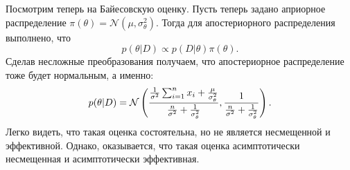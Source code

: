 \begin{example}
Посмотрим теперь на Байесовскую оценку.
Пусть теперь задано априорное распределение $\pi(\theta) = \mathcal{N}(\mu, \sigma_{\theta}^2)$.
Тогда для апостериорного распределения выполнено, что
\[
p(\theta | D) \propto p(D| \theta) \pi(\theta).
\] 
Сделав несложные преобразования получаем, что
апостериорное распределение тоже будет нормальным, а именно:
\[
p(\theta | D) = \mathcal{N} \left(\frac{\frac{1}{\sigma^2} \sum_{i = 1}^{n} x_i + \frac{\mu}{\sigma_{\theta}^2}}{\frac{n}{\sigma^2} + \frac{1}{\sigma_{\theta}^2}}, \frac{1}{\frac{n}{\sigma^2} + \frac{1}{\sigma_{\theta}^2}} \right).
\] 
Легко видеть, что такая оценка состоятельна, но не является несмещенной и эффективной.
Однако, оказывается, что такая оценка асимптотически несмещенная и асимптотически эффективная.
\end{example}

 